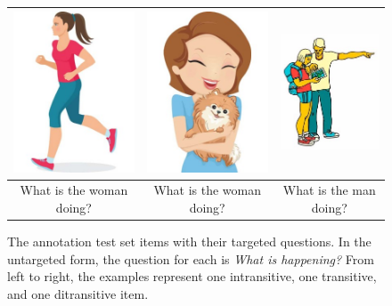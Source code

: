 \begin{figure}[htb!]
\begin{center}
\begin{tabular}{|c|c|c|}
\hline
{\includegraphics[width=0.29\columnwidth]{figures/I30.jpg}} & {\includegraphics[width=0.3\columnwidth]{figures/I29.jpg}} & {\includegraphics[width=0.3\columnwidth]{figures/I28.jpg}} \\
\hline
What is the woman doing? & What is the woman doing? & What is the man doing? \\
\hline
\end{tabular}
\caption{\label{fig:test-sample-items} The annotation test set items with their targeted questions. In the untargeted form, the question for each is \textit{What is happening?} From left to right, the examples represent one intransitive, one transitive, and one ditransitive item.}
\end{center}
\end{figure}

